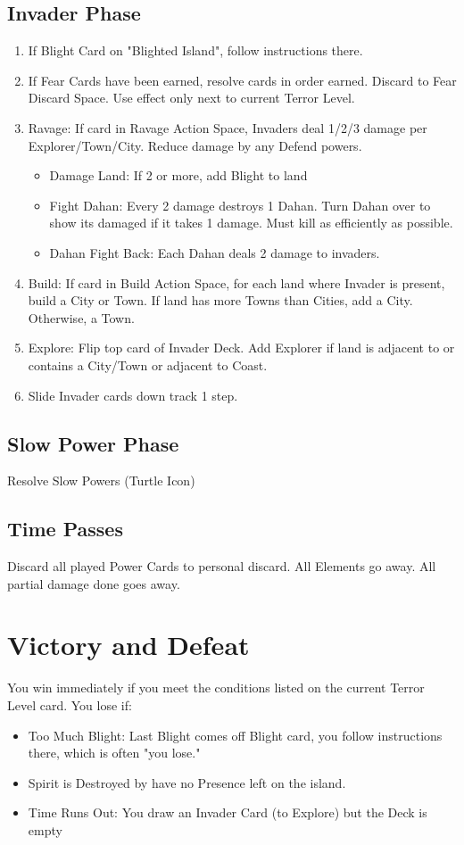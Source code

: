 \documentclass[12pt]{article}
\newenvironment{enumerateCustom}
{\begin{enumerate}
  \setlength{\itemsep}{1pt}
  \setlength{\parskip}{0pt}
  \setlength{\parsep}{0pt}}
{\end{enumerate}}
\newenvironment{itemizeCustom}
{\begin{itemize}
  \setlength{\itemsep}{1pt}
  \setlength{\parskip}{0pt}
  \setlength{\parsep}{0pt}}
{\end{itemize}}
\begin{document}
\begin{multicols*}{2}
\subsection*{Invader Phase}
\begin{enumerateCustom}
    \item If Blight Card on "Blighted Island", follow instructions there.
    \item If Fear Cards have been earned, resolve cards in order earned. Discard to Fear Discard Space. Use effect only next to current Terror Level.
    \item Ravage: If card in Ravage Action Space, Invaders deal 1/2/3 damage per Explorer/Town/City. Reduce damage by any Defend powers.
        \begin{itemizeCustom}
            \item Damage Land: If 2 or more, add Blight to land
            \item Fight Dahan: Every 2 damage destroys 1 Dahan. Turn Dahan over to show its damaged if it takes 1 damage. Must kill as efficiently as possible.
            \item Dahan Fight Back: Each Dahan deals 2 damage to invaders.
        \end{itemizeCustom}
    \item Build: If card in Build Action Space, for each land where Invader is present, build a City or Town. If land has more Towns than Cities, add a City. Otherwise, a Town.
    \item Explore: Flip top card of Invader Deck. Add Explorer if land is adjacent to or contains a City/Town or adjacent to Coast.
    \item Slide Invader cards down track 1 step.
\end{enumerateCustom}

\subsection*{Slow Power Phase}
Resolve Slow Powers (Turtle Icon)

\subsection*{Time Passes}
Discard all played Power Cards to personal discard. All Elements go away. All partial damage done goes away.

\section*{Victory and Defeat}
You win immediately if you meet the conditions listed on the current Terror Level card. You lose if:
\begin{itemizeCustom}
    \item Too Much Blight: Last Blight comes off Blight card, you follow instructions there, which is often "you lose."
    \item Spirit is Destroyed by have no Presence left on the island.
    \item Time Runs Out: You draw an Invader Card (to Explore) but the Deck is empty
\end{itemizeCustom}

\end{multicols*}
\end{document}
